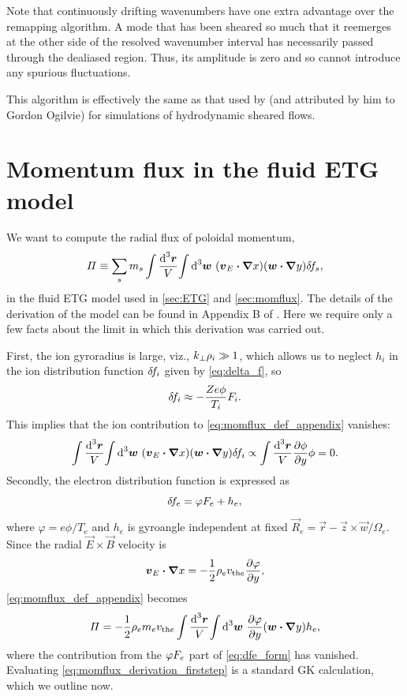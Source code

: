 \documentclass{jpp}
\newcommand{\phinorm}{\varphi}
\begin{document}
Note that continuously drifting wavenumbers have one extra advantage over the remapping algorithm. A mode that has been sheared so much that it reemerges at the other side of the resolved wavenumber interval has necessarily passed through the dealiased region. Thus, its amplitude is zero and so cannot introduce any spurious fluctuations.

This algorithm is effectively the same as that used by \citet{lithwick07_shear} (and attributed by him to Gordon Ogilvie) for simulations of hydrodynamic sheared flows.


\section{Momentum flux in the fluid ETG model}
\label{appendix:momflux_ETG}

We want to compute the radial flux of poloidal momentum,
\begin{equation}
	\varPi \equiv \sum_s m_s \int \frac{\text{d}^3 \boldsymbol{r}}{V} {\int \text{d}^{3} \boldsymbol{w} \ } (\boldsymbol{v}_E \boldsymbol{\cdot} {\boldsymbol{\nabla}} x) (\boldsymbol{w} \boldsymbol{\cdot} {\boldsymbol{\nabla}} y) \delta \! f_{s},
	\label{eq:momflux_def_appendix}
\end{equation}
in the fluid ETG model used in \cref{sec:ETG} and \cref{sec:momflux}. The details of the derivation of the model can be found in Appendix B of \citet{adkins23}. Here we require only a few facts about the limit in which this derivation was carried out. 

First, the ion gyroradius is large, viz., \(k_\perp \rho_i \gg 1\), which allows us to neglect \(h_i\) in the ion distribution function \(\delta \! f_{i}\) given by \cref{eq:delta_f}, so
\begin{equation}
	\delta \! f_{i} \approx -\frac{Ze \phi}{T_{i}} F_{i}.
\end{equation}
This implies that the ion contribution to \cref{eq:momflux_def_appendix} vanishes:
\begin{equation}
	\int \frac{\text{d}^3 \boldsymbol{r}}{V} {\int \text{d}^{3} \boldsymbol{w} \ } (\boldsymbol{v}_E \boldsymbol{\cdot} {\boldsymbol{\nabla}} x) (\boldsymbol{w} \boldsymbol{\cdot} {\boldsymbol{\nabla}} y) \delta \! f_{i} \propto \int \frac{\text{d}^3 \boldsymbol{r}}{V} \frac{\partial \phi}{\partial y} \phi = 0.
\end{equation}
Secondly, the electron distribution function is expressed as 
\begin{equation}
	\dfe = \phinorm\Fe + h_e,
	\label{eq:dfe_form}
\end{equation}
where \(\phinorm = e \phi / T_{e}\) and \(h_e\) is gyroangle independent at fixed \(\vec{R}_e = \vec{r} - \hat{\vec{z}}\times\vec{w}/\Omega_e\). Since the radial \(\vec{E}\times \vec{B}\) velocity is
\begin{equation}
	\vec{v}_E \bcdot \grad x = -\frac{1}{2}\rhoe\vthe\frac{\partial \phinorm}{\partial y},
\end{equation}
\cref{eq:momflux_def_appendix} becomes
\begin{equation}
	\Pi = -\frac{1}{2}\rhoe m_e\vthe \int \frac{\rmd^3 \vec{r}}{V} \intw \frac{\partial \phinorm}{\partial y}(\vec{w} \bcdot \grad y) h_e,
	\label{eq:momflux_derivation_firststep}
\end{equation}
where the contribution from the \(\phinorm\Fe\) part of \cref{eq:dfe_form} has vanished. Evaluating \cref{eq:momflux_derivation_firststep} is a standard GK calculation, which we outline now. 
\end{document}
